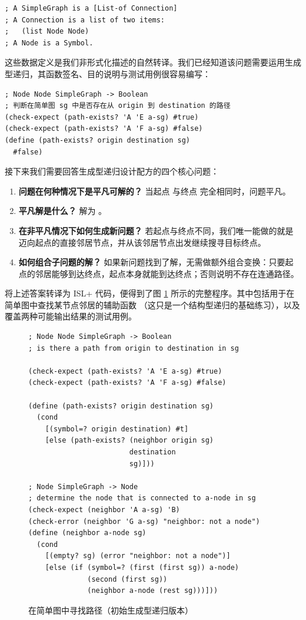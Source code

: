 \begin{lstlisting}[language=BSL]
; A SimpleGraph is a [List-of Connection]
; A Connection is a list of two items:
;   (list Node Node)
; A Node is a Symbol.
\end{lstlisting}

这些数据定义是我们非形式化描述的自然转译。我们已经知道该问题需要运用生成型递归，其函数签名、目的说明与测试用例很容易编写：

\begin{lstlisting}[language=BSL]
; Node Node SimpleGraph -> Boolean
; 判断在简单图 sg 中是否存在从 origin 到 destination 的路径
(check-expect (path-exists? 'A 'E a-sg) #true)
(check-expect (path-exists? 'A 'F a-sg) #false)
(define (path-exists? origin destination sg)
  #false)
\end{lstlisting}

接下来我们需要回答生成型递归设计配方的四个核心问题：
\begin{enumerate}
  \item \textbf{问题在何种情况下是平凡可解的？} 当起点  与终点  完全相同时，问题平凡。
  \item \textbf{平凡解是什么？} 解为 。
  \item \textbf{在非平凡情况下如何生成新问题？} 若起点与终点不同，我们唯一能做的就是迈向起点的直接邻居节点，并从该邻居节点出发继续搜寻目标终点。
  \item \textbf{如何组合子问题的解？} 如果新问题找到了解，无需做额外组合变换：只要起点的邻居能够到达终点，起点本身就能到达终点；否则说明不存在连通路径。
\end{enumerate}

将上述答案转译为 ISL+ 代码，便得到了图 \ref{fig:180} 所示的完整程序。其中包括用于在简单图中查找某节点邻居的辅助函数 （这只是一个结构型递归的基础练习），以及覆盖两种可能输出结果的测试用例。

\begin{figure}[htbp]
  \centering
\begin{lstlisting}[language=BSL, basicstyle=\scriptsize\ttfamily]
; Node Node SimpleGraph -> Boolean
; is there a path from origin to destination in sg

(check-expect (path-exists? 'A 'E a-sg) #true)
(check-expect (path-exists? 'A 'F a-sg) #false)

(define (path-exists? origin destination sg)
  (cond
    [(symbol=? origin destination) #t]
    [else (path-exists? (neighbor origin sg)
                        destination
                        sg)]))

; Node SimpleGraph -> Node
; determine the node that is connected to a-node in sg
(check-expect (neighbor 'A a-sg) 'B)
(check-error (neighbor 'G a-sg) "neighbor: not a node")
(define (neighbor a-node sg)
  (cond
    [(empty? sg) (error "neighbor: not a node")]
    [else (if (symbol=? (first (first sg)) a-node)
              (second (first sg))
              (neighbor a-node (rest sg)))]))
\end{lstlisting}
  \caption{在简单图中寻找路径（初始生成型递归版本）}
  \label{fig:180}
\end{figure}

